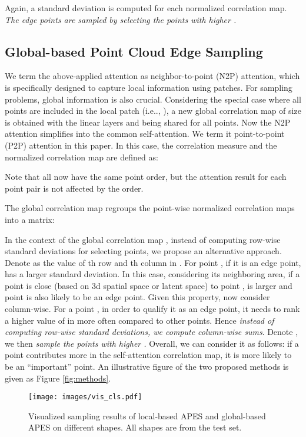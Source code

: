 \documentclass[10pt,twocolumn,letterpaper]{article}
\makeatletter
\DeclareRobustCommand\onedot{\futurelet\@let@token\@onedot}
\def\@onedot{\ifx\@let@token.\else.\null\fi\xspace}
\def\ie{i.e\onedot} \def\Ie{I.e\onedot}
\makeatother
\begin{document}
Again, a standard deviation  is computed for each normalized correlation map. \emph{The edge points are sampled by selecting the points with higher .}
 

\subsection{Global-based Point Cloud Edge Sampling}
We term the above-applied attention as neighbor-to-point (N2P) attention, which is specifically designed to capture local information using patches. For sampling problems, global information is also crucial. 
Considering the special case where all points are included in the local patch (\ie, ), a new global correlation map  of size  is obtained with the linear layers  and  being shared for all points. Now the N2P attention simplifies into the common self-attention. We term it point-to-point (P2P) attention in this paper.
In this case, the correlation measure  and the normalized correlation map are defined as:

Note that all  now have the same point order, but the attention result for each point pair is not affected by the order.

The global correlation map  regroups the point-wise normalized correlation maps into a  matrix:

In the context of the global correlation map , instead of computing row-wise standard deviations for selecting points, we propose an alternative approach. 
Denote  as the value of th row and th column in . For point , if it is an edge point,  has a larger standard deviation. In this case, considering its neighboring area, if a point  is close (based on 3d spatial space or latent space) to point ,  is larger and point  is also likely to be an edge point. Given this property, now consider  column-wise. For a point , in order to qualify it as an edge point, it needs to rank a higher value of  in  more often compared to other points.
Hence \emph{instead of computing row-wise standard deviations, we compute column-wise sums}. 
Denote , we then \emph{sample the points with higher .}
Overall, we can consider it as follows: if a point contributes more in the self-attention correlation map, it is more likely to be an \enquote{important} point.
An illustrative figure of the two proposed methods is given as Figure \ref{fig:methods}. 

\begin{figure*}[t]
    \centering
    \texttt{[image: images/vis\_cls.pdf]}
    \caption{Visualized sampling results of local-based APES and global-based APES on different shapes. All shapes are from the test set.}
    \label{fig:vis_cls}
\end{figure*}
\end{document}
